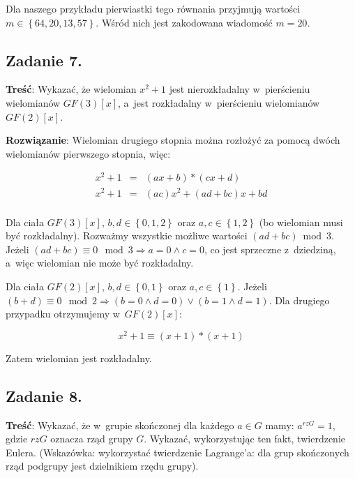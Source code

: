 \documentclass[a4paper,10pt, twocolumn]{article}
\begin{document}
\noindent Dla naszego przykładu pierwiastki tego równania przyjmują wartości $m \in \left\{ 64, 20, 13, 57 \right\}$. Wśród nich jest zakodowana wiadomość $m = 20$.

\subsection{Zadanie 7.}

\textbf{Treść}: Wykazać, że wielomian $x^{2} + 1$ jest nierozkładalny w~pierścieniu wielomianów $GF(3)[x]$, a~jest rozkładalny w~pierścieniu wielomianów $GF(2)[x]$.

\textbf{Rozwiązanie}: Wielomian drugiego stopnia można rozłożyć za pomocą dwóch wielomianów pierwszego stopnia, więc:

\begin{equation*}
	\begin{array}{lcl} x^{2} + 1 & = & (ax + b) * (cx + d) \\ x^{2} + 1 & = & (ac)x^{2} + (ad + bc)x + bd \\ \end{array}
\end{equation*}

Dla ciała $GF(3)[x]$, $b, d \in \left\{0, 1, 2\right\}$ oraz $a, c \in \left\{1, 2\right\}$ (bo wielomian musi być rozkładalny). Rozważmy wszystkie możliwe wartości $(ad + bc) \bmod{3}$. Jeżeli $(ad + bc) \equiv 0 \mod 3 \Rightarrow a = 0 \wedge c = 0$, co jest sprzeczne z~dziedziną, a~więc wielomian nie może być rozkładalny.

Dla ciała $GF(2)[x]$, $b, d \in \left\{0, 1\right\}$ oraz $a, c \in \left\{1\right\}$. Jeżeli $(b + d) \equiv 0 \mod 2 \Rightarrow (b = 0 \wedge d = 0) \vee (b = 1 \wedge d = 1)$. Dla drugiego przypadku otrzymujemy w~$GF(2)[x]$:

\begin{equation*}
	x^{2} + 1 \equiv (x+1) * (x+1)
\end{equation*}

Zatem wielomian jest rozkładalny.

\subsection{Zadanie 8.}

\textbf{Treść}: Wykazać, że w~grupie skończonej dla każdego $a \in G$ mamy: $a^{rzG} = 1$, gdzie $rzG$ oznacza rząd grupy $G$. Wykazać, wykorzystując ten fakt, twierdzenie Eulera. (Wskazówka: wykorzystać twierdzenie Lagrange'a: dla grup skończonych rząd podgrupy jest dzielnikiem rzędu grupy).
\end{document}
